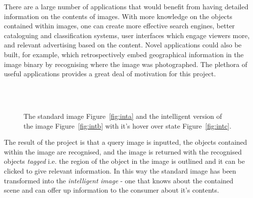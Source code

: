 \documentclass[11pt, onecolumn, a4paper, final]{report} %
\begin{document}
There are a large number of applications that would benefit from having detailed information on the contents of images. With more knowledge on the objects contained within images, one can create more effective search engines, better cataloguing and classification systems, user interfaces which engage viewers more, and relevant advertising based on the content. Novel applications could also be built, for example, which retrospectively embed geographical information in the image binary by recognising where the image was photographed. The plethora of useful applications provides a great deal of motivation for this project.

\begin{figure}[ht]
\centering 
{}
\\
~
\caption{The standard image Figure~\ref{fig:inta} and the intelligent version of the image Figure~\ref{fig:intb} with it's hover over state Figure~\ref{fig:intc}.}
\label{fig:intimage}
\end{figure}

The result of the project is that a query image is inputted, the objects contained within the image are recognised, and the image is returned with the recognised objects \emph{tagged} i.e. the region of the object in the image is outlined and it can be clicked to give relevant information. In this way the standard image has been transformed into the \emph{intelligent image} - one that knows about the contained scene and can offer up information to the consumer about it's contents.
\end{document}
